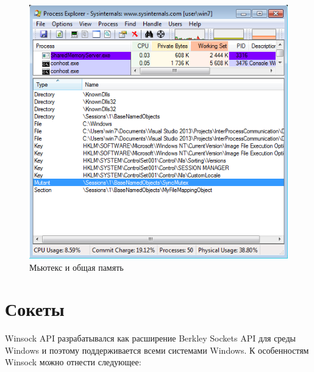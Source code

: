 \documentclass[a4paper, 12pt]{report}		%
\begin{document}
\begin{figure}[h!]
\centering
\includegraphics[scale=1]{res/09_Process_Explorer}
\caption{Мьютекс и общая память}
\end{figure}

\chapter*{Сокеты}

Winsock API разрабатывался как расширение Berkley Sockets API для среды Windows и поэтому поддерживается всеми системами Windows. К особенностям Winsock можно отнести следующее:
\end{document}
